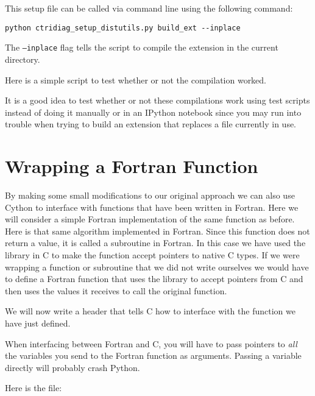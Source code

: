 

This setup file can be called via command line using the following command:
\begin{lstlisting}[style=ShellInput]
python ctridiag_setup_distutils.py build_ext --inplace
\end{lstlisting}
The \texttt{--inplace} flag tells the script to compile the extension in the current directory.

Here is a simple script to test whether or not the compilation worked.



\begin{info}
It is a good idea to test whether or not these compilations work using test scripts instead of doing it manually or in an IPython notebook since you may run into trouble when trying to build an extension that replaces a file currently in use.
\end{info}

\section*{Wrapping a Fortran Function}
By making some small modifications to our original approach we can also use Cython to interface with functions that have been written in Fortran.
Here we will consider a simple Fortran implementation of the same function as before.
Here is that same algorithm implemented in Fortran.
Since this function does not return a value, it is called a subroutine in Fortran.
In this case we have used the  library in C to make the function accept pointers to native C types.
If we were wrapping a function or subroutine that we did not write ourselves we would have to define a Fortran function that uses the  library to accept pointers from C and then uses the values it receives to call the original function.


We will now write a header that tells C how to interface with the function we have just defined.
\begin{warn}
When interfacing between Fortran and C, you will have to pass pointers to \emph{all} the variables you send to the Fortran function as arguments.
Passing a variable directly will probably crash Python.
\end{warn}
Here is the file:


